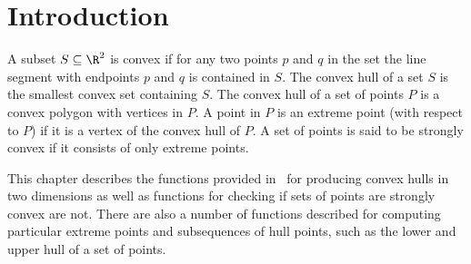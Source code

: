 \section{Introduction}

A subset $S \subseteq \R^2$ is convex if for any two points $p$ and $q$
in the set the line segment with endpoints $p$ and $q$ is contained
in $S$. The convex hull of a set $S$ 
is the smallest convex set containing
$S$. The convex hull of a set of points $P$ is a convex 
polygon with vertices in $P$. A point in $P$ is an extreme point 
(with respect to $P$) if it is a vertex of 
the convex hull of $P$.  A set of points is said to be strongly convex %
 if it consists of only extreme points.

This chapter describes the functions provided in
\cgal\ for producing convex hulls in two dimensions as well as
functions for checking if sets of points are strongly convex are not.  
There are also a number of functions described for computing particular 
extreme points and subsequences of hull points, such as the lower and 
upper hull of a set of points.
